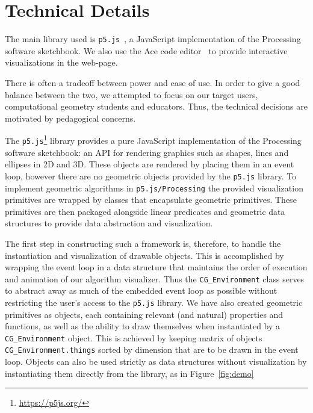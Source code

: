 \documentclass[a4paper,UKenglish]{lipics-v2016}
\begin{document}
\section{Technical Details} %
\label{sec:technical_details}

  The main library used is \texttt{p5.js}~\cite{p5js}, a JavaScript implementation of the Processing software sketchbook.
  We also use the Ace code editor~\cite{ace} to provide interactive visualizations in the web-page.
  
  There is often a tradeoff between power and ease of use.
  In order to give a good balance between the two, we attempted to focus on our target users, computational geometry students and educators.
  Thus, the technical decisions are motivated by pedagogical concerns.
  
  The \texttt{p5.js}\footnote{\url{https://p5js.org/}} library provides a pure JavaScript implementation of the Processing software sketchbook: an API for rendering graphics such as shapes, lines and ellipses in 2D and 3D.
  These objects are rendered by placing them in an event loop, however there are no geometric objects provided by the \texttt{p5.js} library.
  To implement geometric algorithms in \texttt{p5.js/Processing} the provided visualization primitives are wrapped by classes that encapsulate geometric primitives.
  These primitives are then packaged alongside linear predicates and geometric data structures to provide data abstraction and visualization.

  The first step in constructing such a framework is, therefore, to handle the instantiation and visualization of drawable objects.
  This is accomplished by wrapping the event loop in a data structure that maintains the order of execution and animation of our algorithm visualizer.
  Thus the \texttt{CG\_Environment} class serves to abstract away as much of the embedded event loop as possible without restricting the user's access to the \texttt{p5.js} library.
  We have also created geometric primitives as objects, each containing relevant (and natural) properties and functions, as well as the ability to draw themselves when instantiated by a \texttt{CG\_Environment} object.
  This is achieved by keeping matrix of objects \texttt{CG\_Environment.things} sorted by dimension that are to be drawn in the event loop.
  Objects can also be used strictly as data structures without visualization by instantiating them directly from the library, as in Figure~\ref{fig:demo}
  
\end{document}
